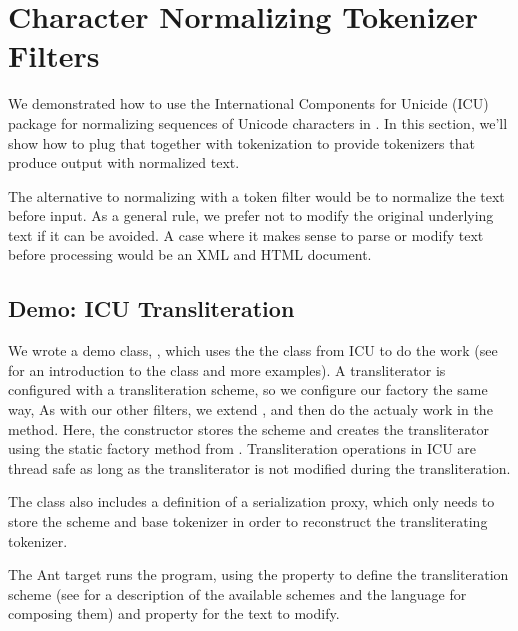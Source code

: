 \section{Character Normalizing Tokenizer Filters}

We demonstrated how to use the International Components for Unicide
(ICU) package for normalizing sequences of Unicode characters in
.  In this section, we'll show how
to plug that together with tokenization to provide tokenizers that
produce output with normalized text.  

The alternative to normalizing with a token filter would be to
normalize the text before input.  As a general rule, we prefer not to
modify the original underlying text if it can be avoided.  A case
where it makes sense to parse or modify text before processing would
be an XML and HTML document.  

\subsection{Demo: ICU Transliteration}

We wrote a demo class, , which
uses the the  class from ICU to do the work (see
 for an introduction to the class and
more examples).  A transliterator is configured with a transliteration
scheme, so we configure our factory the same way,
%
%
As with our other filters, we extend
, and then do the actualy work in
the  method.  Here, the constructor stores
the scheme and creates the transliterator using the static factory
method  from .
Transliteration operations in ICU are thread safe as long as the
transliterator is not modified during the transliteration.

The class also includes a definition of a serialization proxy,
which only needs to store the scheme and base tokenizer in order
to reconstruct the transliterating tokenizer.

The Ant target  runs the program,
using the property  to define the
transliteration scheme (see  for
a description of the available schemes and the language for
composing them) and property  for the text to modify.
%
\commandlinefollow{}
\begin{verbatim}

\end{verbatim}



